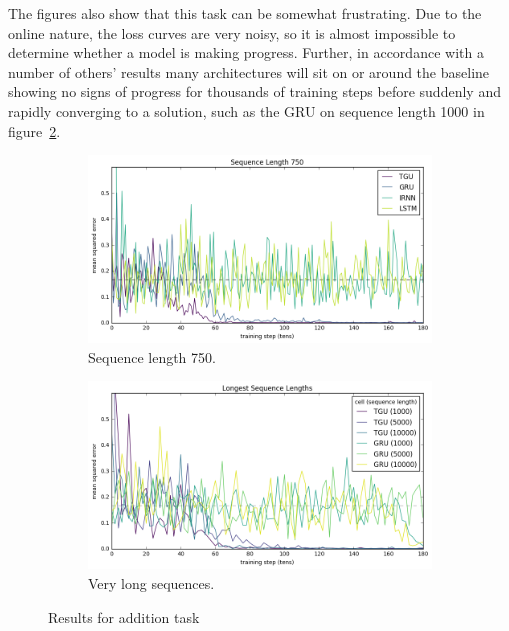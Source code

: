 The figures also show that this task can be somewhat frustrating. Due to the online nature, the loss
curves are very noisy, so it is almost impossible to determine whether a model is making progress.
Further, in accordance with a number of others' results \autocite{Le2015, Arjovsky2015} many
architectures will sit on or around the baseline showing no signs of progress for thousands of
training steps before suddenly and rapidly converging to a solution, such as
the GRU on sequence length 1000 in figure~\ref{fig:addlong}.
\begin{figure}[ht]
\begin{subfigure}[t]{0.75\textwidth}
\includegraphics[width=\textwidth]{exps/addition/sl750}
\caption{Sequence length 750.}
\label{fig:add750}
\end{subfigure}

\begin{subfigure}[t]{0.75\textwidth}
\centering
\includegraphics[width=\textwidth]{exps/addition/long}
\caption{Very long sequences.}
\label{fig:addlong}
\end{subfigure}

\caption{Results for addition task}
\label{fig:addresults}
\end{figure}

